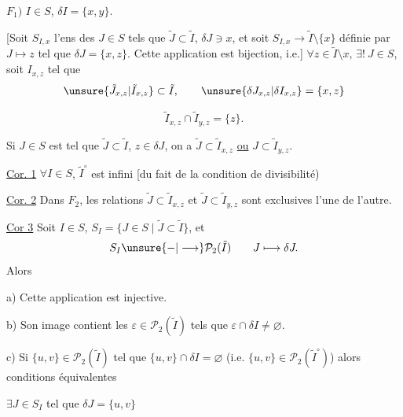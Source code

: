 $F_1)$  $I\in S$, $\delta I=\{x,y\}$. 

[Soit $S_{I,x}$ l'ens des $J\in S$ tels que $\tilde J\subset\tilde I$, $\delta J\ni x$, et soit
$S_{I,x}\longrightarrow\tilde I\setminus\{x\}$ définie par
$J\longmapsto z$ tel que $\delta J=\{x,z\}$. Cette application est bijection, i.e.]
$\forall z\in\tilde I\setminus x$, $\exists!\ J\in S$,  soit $I_{x,z}$ tel que
\[
\unsure{\tilde J_{x,z}|\tilde I_{x,z}}\subset\tilde I,\qquad
\unsure{\delta J_{x,z}|\delta I_{x,z}}=\{x,z\}
\]

\[
\tilde I_{x,z}\cap\tilde I_{y,z}=\{z\}.
\]

Si $J\in S$ est tel que $\tilde J\subset\tilde I$, $z\in\delta J$,
on a $\tilde J\subset\tilde I_{x,z}$ \uline{ou} $J\subset\tilde I_{y,z}$.

\uline{Cor. 1} \deleted{$\unsure{\forall}$} $\forall I\in S$, $\tilde I^\circ$ est infini [du fait de la condition de divisibilité)

\uline{Cor. 2} Dans $F_2$, les relations $\tilde J\subset\tilde I_{x,z}$ et $\tilde J\subset\tilde I_{y,z}$ sont exclusives l'une de l'autre.

\uline{Cor 3} Soit $I\in S$, \deleted{$\unsure{\exists}$} $S_I=\{J\in S\mid\tilde J\subset\tilde I\}$, et
\[
S_I\unsure{-|\longrightarrow}\mathcal P_2(\tilde I)\qquad J\longmapsto\delta J.
\]
Alors 

a) Cette application est injective.

b) Son image contient les $\varepsilon\in\mathcal P_2(\tilde I)$ tels que $\varepsilon\cap\delta I\neq\varnothing$.


c) Si $\{u,v\}\in\mathcal P_2(\tilde I)$ tel que $\{u,v\}\cap\delta I=\varnothing$
(i.e. $\{u,v\}\in\mathcal P_2(\tilde I^\circ)$) alors conditions équivalentes

  $\exists J\in S_I$ tel que $\delta J=\{u,v\}$

